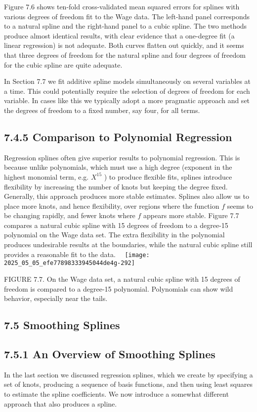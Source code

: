 \documentclass[10pt]{article}
\begin{document}
Figure 7.6 shows ten-fold cross-validated mean squared errors for splines with various degrees of freedom fit to the Wage data. The left-hand panel corresponds to a natural spline and the right-hand panel to a cubic spline. The two methods produce almost identical results, with clear evidence that a one-degree fit (a linear regression) is not adequate. Both curves flatten out quickly, and it seems that three degrees of freedom for the natural spline and four degrees of freedom for the cubic spline are quite adequate.

In Section 7.7 we fit additive spline models simultaneously on several variables at a time. This could potentially require the selection of degrees of freedom for each variable. In cases like this we typically adopt a more pragmatic approach and set the degrees of freedom to a fixed number, say four, for all terms.

\subsection*{7.4.5 Comparison to Polynomial Regression}
Regression splines often give superior results to polynomial regression. This is because unlike polynomials, which must use a high degree (exponent in the highest monomial term, e.g. $X^{15}$ ) to produce flexible fits, splines introduce flexibility by increasing the number of knots but keeping the degree fixed. Generally, this approach produces more stable estimates. Splines also allow us to place more knots, and hence flexibility, over regions where the function $f$ seems to be changing rapidly, and fewer knots where $f$ appears more stable. Figure 7.7 compares a natural cubic spline with 15 degrees of freedom to a degree-15 polynomial on the Wage data set. The extra flexibility in the polynomial produces undesirable results at the boundaries, while the natural cubic spline still provides a reasonable fit to the data.\
\
\texttt{[image: 2025\_05\_05\_efe77898333945044de4g-292]}

FIGURE 7.7. On the Wage data set, a natural cubic spline with 15 degrees of freedom is compared to a degree-15 polynomial. Polynomials can show wild behavior, especially near the tails.

\subsection*{7.5 Smoothing Splines}
\subsection*{7.5.1 An Overview of Smoothing Splines}
In the last section we discussed regression splines, which we create by specifying a set of knots, producing a sequence of basis functions, and then using least squares to estimate the spline coefficients. We now introduce a somewhat different approach that also produces a spline.
\end{document}
